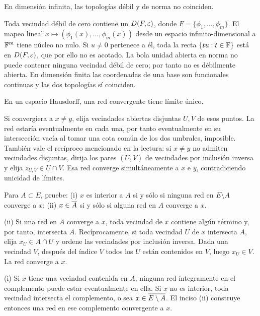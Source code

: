 \begin{ejercicio}\label{ej:v3-l13-4}
En dimensión infinita, las topologías débil y de norma no coinciden.
\end{ejercicio}
\begin{solucion}
Toda vecindad débil de cero contiene un $D(F,\varepsilon)$, donde $F=\{\phi_1,\ldots,\phi_m\}$. El mapeo lineal $x\mapsto(\phi_1(x),\ldots,\phi_m(x))$ desde un espacio infinito-dimensional a $\mathbb F^m$ tiene núcleo no nulo. Si $u\ne0$ pertenece a él, toda la recta $\{tu:t\in\mathbb F\}$ está en $D(F,\varepsilon)$, que por ello no es acotado. La bola unidad abierta en norma no puede contener ninguna vecindad débil de cero; por tanto no es débilmente abierta. En dimensión finita las coordenadas de una base son funcionales continuas y las dos topologías sí coinciden.
\end{solucion}

\begin{ejercicio}\label{ej:v3-l14-1}
En un espacio Hausdorff, una red convergente tiene límite único.
\end{ejercicio}
\begin{solucion}
Si convergiera a $x\ne y$, elija vecindades abiertas disjuntas $U,V$ de esos puntos. La red estaría eventualmente en cada una, por tanto eventualmente en su intersección vacía al tomar una cota común de los dos umbrales, imposible. También vale el recíproco mencionado en la lectura: si $x\ne y$ no admiten vecindades disjuntas, dirija los pares $(U,V)$ de vecindades por inclusión inversa y elija $z_{U,V}\in U\cap V$. Esa red converge simultáneamente a $x$ e $y$, contradiciendo unicidad de límites.
\end{solucion}

\begin{ejercicio}\label{ej:v3-l14-2}
Para $A\subset E$, pruebe: (i) $x$ es interior a $A$ si y sólo si ninguna red en $E\setminus A$ converge a $x$; (ii) $x\in\overline{A}$ si y sólo si alguna red en $A$ converge a $x$.
\end{ejercicio}
\begin{solucion}
(ii) Si una red en $A$ converge a $x$, toda vecindad de $x$ contiene algún término y, por tanto, intersecta $A$. Recíprocamente, si toda vecindad $U$ de $x$ intersecta $A$, elija $x_U\in A\cap U$ y ordene las vecindades por inclusión inversa. Dada una vecindad $V$, después del índice $V$ todos los $U$ están contenidos en $V$, luego $x_U\in V$. La red converge a $x$.

(i) Si $x$ tiene una vecindad contenida en $A$, ninguna red íntegramente en el complemento puede estar eventualmente en ella. Si $x$ no es interior, toda vecindad intersecta el complemento, o sea $x\in\overline{E\setminus A}$. El inciso (ii) construye entonces una red en ese complemento convergente a $x$.
\end{solucion}

